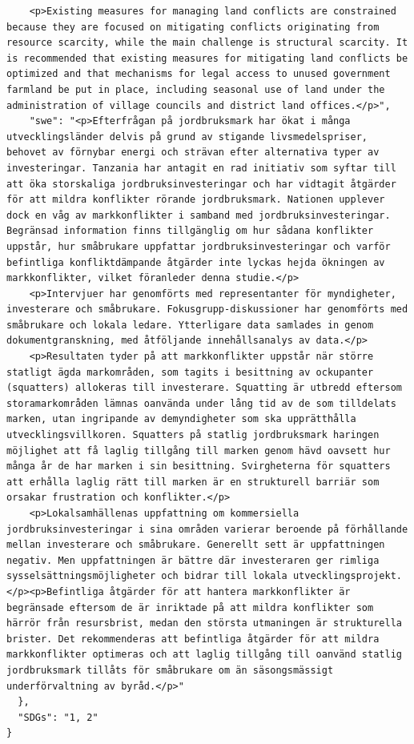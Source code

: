 \begin{casestudySection}
\begin{lstlisting}
    <p>Existing measures for managing land conflicts are constrained because they are focused on mitigating conflicts originating from resource scarcity, while the main challenge is structural scarcity. It is recommended that existing measures for mitigating land conflicts be optimized and that mechanisms for legal access to unused government farmland be put in place, including seasonal use of land under the administration of village councils and district land offices.</p>",
    "swe": "<p>Efterfrågan på jordbruksmark har ökat i många utvecklingsländer delvis på grund av stigande livsmedelspriser, behovet av förnybar energi och strävan efter alternativa typer av investeringar. Tanzania har antagit en rad initiativ som syftar till att öka storskaliga jordbruksinvesteringar och har vidtagit åtgärder för att mildra konflikter rörande jordbruksmark. Nationen upplever dock en våg av markkonflikter i samband med jordbruksinvesteringar. Begränsad information finns tillgänglig om hur sådana konflikter uppstår, hur småbrukare uppfattar jordbruksinvesteringar och varför befintliga konfliktdämpande åtgärder inte lyckas hejda ökningen av markkonflikter, vilket föranleder denna studie.</p>
    <p>Intervjuer har genomförts med representanter för myndigheter, investerare och småbrukare. Fokusgrupp-diskussioner har genomförts med småbrukare och lokala ledare. Ytterligare data samlades in genom dokumentgranskning, med åtföljande innehållsanalys av data.</p>
    <p>Resultaten tyder på att markkonflikter uppstår när större statligt ägda markområden, som tagits i besittning av ockupanter (squatters) allokeras till investerare. Squatting är utbredd eftersom storamarkområden lämnas oanvända under lång tid av de som tilldelats marken, utan ingripande av demyndigheter som ska upprätthålla utvecklingsvillkoren. Squatters på statlig jordbruksmark haringen möjlighet att få laglig tillgång till marken genom hävd oavsett hur många år de har marken i sin besittning. Svirgheterna för squatters att erhålla laglig rätt till marken är en strukturell barriär som orsakar frustration och konflikter.</p>
    <p>Lokalsamhällenas uppfattning om kommersiella jordbruksinvesteringar i sina områden varierar beroende på förhållande mellan investerare och småbrukare. Generellt sett är uppfattningen negativ. Men uppfattningen är bättre där investeraren ger rimliga sysselsättningsmöjligheter och bidrar till lokala utvecklingsprojekt.</p><p>Befintliga åtgärder för att hantera markkonflikter är begränsade eftersom de är inriktade på att mildra konflikter som härrör från resursbrist, medan den största utmaningen är strukturella brister. Det rekommenderas att befintliga åtgärder för att mildra markkonflikter optimeras och att laglig tillgång till oanvänd statlig jordbruksmark tillåts för småbrukare om än säsongsmässigt underförvaltning av byråd.</p>"
  },
  "SDGs": "1, 2"
}
\end{lstlisting}


\end{casestudySection}
